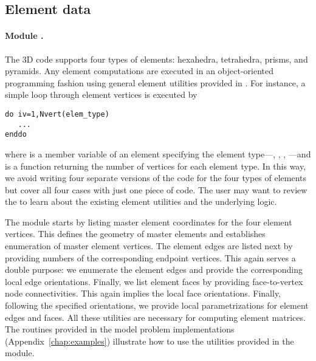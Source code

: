 \subsection{Element data}
\label{sec:element-data}

\paragraph{Module .}
The \hp3D code supports four types of elements: hexahedra, tetrahedra, prisms, and pyramids. Any element computations are executed in an object-oriented programming fashion using general element utilities provided in . For instance, a simple loop through element vertices is executed by

\begin{lstlisting}[caption=Loop over element vertices., label={lst:loop_element_vertices}]
do iv=1,Nvert(elem_type)
   ...
enddo
\end{lstlisting}

\noindent where  is a member variable of an element specifying the element type---, , , ---and  is a function returning the number of vertices for each element type. In this way, we avoid writing four separate versions of the code for the four types of elements but cover all four cases with just one piece of code. The user may want to review the   to learn about the existing element utilities and the underlying logic. 

The  module starts by listing master element coordinates for the four element vertices. This defines the geometry of master elements and establishes enumeration of master element vertices. The element edges are listed next by providing numbers of the corresponding endpoint vertices. This again serves a double purpose: we enumerate the element edges and provide the corresponding local edge orientations. Finally, we list element faces by providing face-to-vertex node connectivities. This again implies the local face orientations. Finally, following the specified orientations, we provide local parametrizations for element edges and faces. All these utilities are necessary for computing element matrices. The  routines provided in the model problem implementations (Appendix~\ref{chap:examples}) illustrate how to use the utilities provided in the module.

